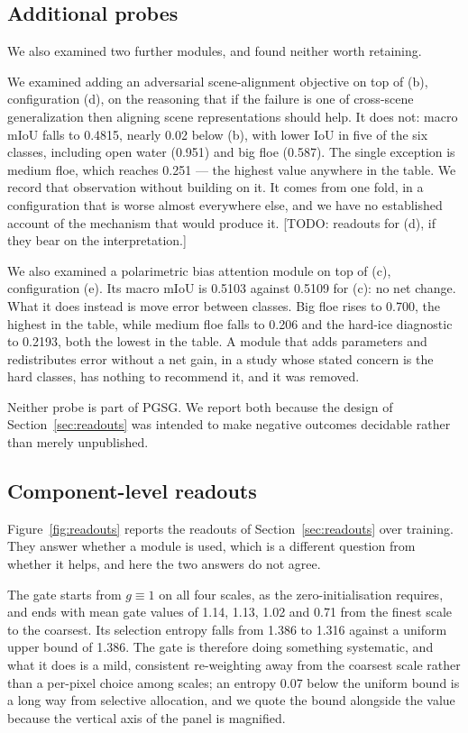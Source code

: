 \documentclass[preprint,12pt,authoryear]{elsarticle}
\begin{document}
\subsection{Additional probes}

We also examined two further modules, and found neither worth retaining.

We examined adding an adversarial scene-alignment objective on top of (b),
configuration (d), on the reasoning that if the failure is one of cross-scene
generalization then aligning scene representations should help. It does not:
macro mIoU falls to 0.4815, nearly 0.02 below (b), with lower IoU in five of the
six classes, including open water (0.951) and big floe (0.587). The single
exception is medium floe, which reaches 0.251 --- the highest value anywhere in
the table. We record that observation without building on it. It comes from one
fold, in a configuration that is worse almost everywhere else, and we have no
established account of the mechanism that would produce it.
[TODO: readouts for (d), if they bear on the interpretation.]

We also examined a polarimetric bias attention module on top of (c),
configuration (e). Its macro mIoU is 0.5103 against 0.5109 for (c): no net
change. What it does instead is move error between classes. Big floe rises to
0.700, the highest in the table, while medium floe falls to 0.206 and the
hard-ice diagnostic to 0.2193, both the lowest in the table. A module that adds
parameters and redistributes error without a net gain, in a study whose stated
concern is the hard classes, has nothing to recommend it, and it was removed.

Neither probe is part of PGSG. We report both because the design of
Section~\ref{sec:readouts} was intended to make negative outcomes decidable
rather than merely unpublished.

\subsection{Component-level readouts}

Figure~\ref{fig:readouts} reports the readouts of Section~\ref{sec:readouts}
over training. They answer whether a module is used, which is a different
question from whether it helps, and here the two answers do not agree.

The gate starts from $g \equiv 1$ on all four scales, as the zero-initialisation
requires, and ends with mean gate values of 1.14, 1.13, 1.02 and 0.71 from the
finest scale to the coarsest. Its selection entropy falls from 1.386 to 1.316
against a uniform upper bound of 1.386. The gate is therefore doing something
systematic, and what it does is a mild, consistent re-weighting away from the
coarsest scale rather than a per-pixel choice among scales; an entropy 0.07
below the uniform bound is a long way from selective allocation, and we quote
the bound alongside the value because the vertical axis of the panel is
magnified.
\end{document}
